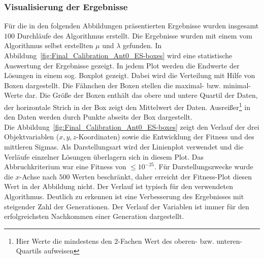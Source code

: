 \subsubsection{Visualisierung der Ergebnisse}
Für die in den folgenden Abbildungen präsentierten Ergebnisse wurden insgesamt $100$ Durchläufe des Algorithmus erstellt. Die Ergebnisse wurden mit einem vom Algorithmus selbst erstellten $\mu$ und $\lambda$ gefunden. In Abbildung~\ref{fig:Final_Calibration_Ant0_ES-boxes} wird eine statistische Auswertung der Ergebnisse gezeigt. In jedem Plot werden die Endwerte der Lösungen in einem sog. Boxplot gezeigt. Dabei wird die Verteilung mit Hilfe von Boxen dargestellt. Die Fähnchen der Boxen stellen die maximal- bzw. minimal-Werte dar. Die Größe der Boxen enthält das obere und untere Quartil der Daten, der horizontale Strich in der Box zeigt den Mittelwert der Daten. Ausreißer\footnote{Hier Werte die mindestens den $2$-Fachen Wert des oberen- bzw. unteren-Quartils aufweisen} in den Daten werden durch Punkte abseits der Box dargestellt.\\
%

Die Abbildung~\ref{fig:Final_Calibration_Ant0_ES-boxes} zeigt den Verlauf der drei Objektvariablen ($x,y,z$-Koordinaten) sowie die Entwicklung der Fitness und des mittleren Sigmas. Als Darstellungsart wird der Linienplot verwendet und die Verläufe einzelner Lösungen überlagern sich in diesem Plot. Das Abbruchkriterium war eine Fitness von $\leq 10^{-25}$.%
Für Darstellungszwecke wurde die $x$-Achse nach $500$ Werten beschränkt, daher erreicht der Fitness-Plot diesen Wert in der Abbildung nicht. Der Verlauf ist typisch für den verwendeten Algorithmus. Deutlich zu erkennen ist eine Verbesserung des Ergebnisses mit steigender Zahl der Generationen. Der Verlauf der Variablen ist immer für den erfolgreichsten Nachkommen einer Generation dargestellt.\\
%

